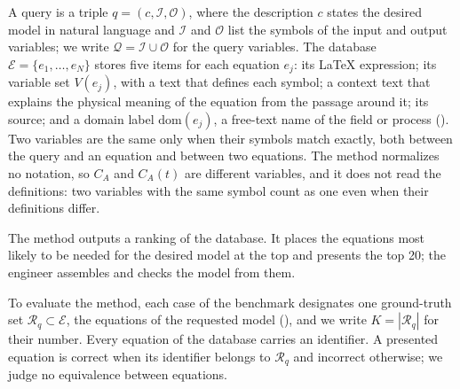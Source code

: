 A query is a triple $q = (c, \mathcal{I}, \mathcal{O})$, where the description $c$ states the
desired model in natural language and $\mathcal{I}$ and $\mathcal{O}$ list the symbols of the input
and output variables; we write $\mathcal{Q} = \mathcal{I} \cup \mathcal{O}$ for the query
variables. The database $\mathcal{E} = \{e_1, \dots, e_N\}$ stores five items for each equation
$e_j$: its \LaTeX{} expression; its variable set $V(e_j)$, with a text that defines each symbol; a
context text that explains the physical meaning of the equation from the passage around it; its
source; and a domain label $\mathrm{dom}(e_j)$, a free-text name of the field or process
(). Two variables are the same only when their symbols match exactly, both
between the query and an equation and between two equations. The method normalizes no notation, so
$C_A$ and $C_A(t)$ are different variables, and it does not read the definitions: two variables
with the same symbol count as one even when their definitions differ.

The method outputs a ranking of the database. It places the equations most likely to be needed for
the desired model at the top and presents the top 20; the engineer assembles and checks the model
from them.

To evaluate the method, each case of the benchmark designates one ground-truth set
$\mathcal{R}_q \subset \mathcal{E}$, the equations of the requested model (),
and we write $K = |\mathcal{R}_q|$ for their number. Every equation of the database carries an
identifier. A presented equation is correct when its identifier belongs to $\mathcal{R}_q$ and
incorrect otherwise; we judge no equivalence between equations.
